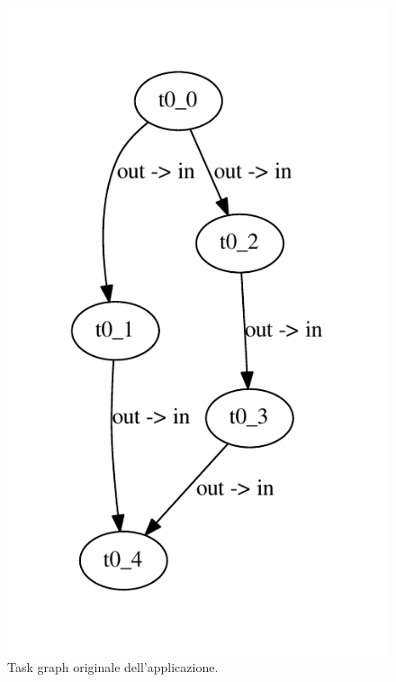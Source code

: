 \begin{figure}[t]
 \begin{center}
  \includegraphics[height=0.4\textheight]{./capitoli/figure/cap6/TaskGraph.pdf}
  \caption{Task graph originale dell'applicazione.}
  \label{fig:originalTG}
 \end{center}
\end{figure}


